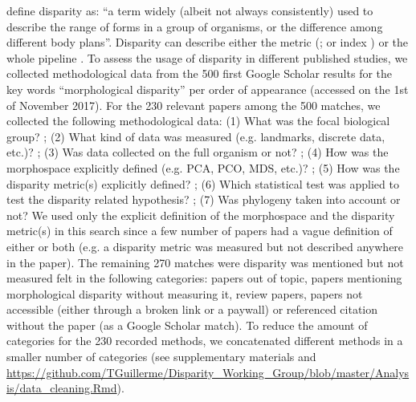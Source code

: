 \documentclass[12pt,letterpaper]{article}
\begin{document}
\cite{prentice2011} define disparity as: ``a term widely (albeit not always consistently) used to describe the range of forms in a group of organisms, or the difference among different body plans''.
Disparity can describe either the metric (\citealt{Wills2001}; or index \citealt{Hopkins2017}) or the whole pipeline \citep{zelditch2012geometric,lloyd2016estimating}.
To assess the usage of disparity in different published studies, we collected methodological data from the 500 first Google Scholar results for the key words ``morphological disparity'' per order of appearance (accessed on the 1st of November 2017).
For the 230 relevant papers among the 500 matches, we collected the following methodological data: (1) What was the focal biological group? ; (2) What kind of data was measured (e.g. landmarks, discrete data, etc.)?  ; (3) Was data collected on the full organism or not? ; (4) How was the morphospace explicitly defined (e.g. PCA, PCO, MDS, etc.)? ; (5) How was the disparity metric(s) explicitly defined? ; (6) Which statistical test was applied to test the disparity related hypothesis? ; (7) Was phylogeny taken into account or not?
We used only the explicit definition of the morphospace and the disparity metric(s) in this search since a few number of papers had a vague definition of either or both (e.g. a disparity metric was measured but not described anywhere in the paper).
The remaining 270 matches were disparity was mentioned but not measured felt in the following categories: papers out of topic, papers mentioning morphological disparity without measuring it, review papers, papers not accessible (either through a broken link or a paywall) or referenced citation without the paper (as a Google Scholar match).
To reduce the amount of categories for the 230 recorded methods, we concatenated different methods in a smaller number of categories (see supplementary materials and \url{https://github.com/TGuillerme/Disparity_Working_Group/blob/master/Analysis/data_cleaning.Rmd}).
\end{document}
